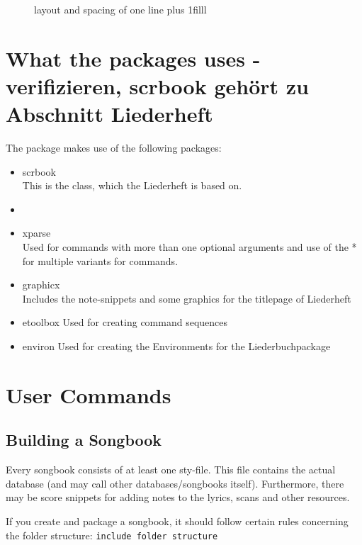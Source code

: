 \documentclass[12pt,a4paper]{scrreprt}
\begin{document}

\begin{figure}
\begin{tikzpicture}

\end{tikzpicture}
\caption{layout and spacing of one line\hskip 0pt plus 1filll\mbox{}}
\label{abb:LiBa}
\end{figure}


\section{What the packages uses - verifizieren, scrbook gehört zu Abschnitt Liederheft}
The package makes use of the following packages:
\begin{itemize}
\item scrbook\\
This is the class, which the Liederheft is based on.
\item[]
\item xparse\\
Used for commands with more than one optional arguments and use of the * for multiple variants for commands.
\item graphicx\\
Includes the note-snippets and some graphics for the titlepage of Liederheft
\item etoolbox
Used for creating command sequences
\item environ
Used for creating the Environments for the Liederbuchpackage

\end{itemize}

\section{User Commands}

\subsection{Building a Songbook}
Every songbook consists of at least one sty-file. This file contains the actual database (and may call other databases/songbooks itself). Furthermore, there may be score snippets for adding notes to the lyrics, scans and other resources.

If you create and package a songbook, it should follow certain rules concerning the folder structure:
\verb+include folder structure+
\end{document}

